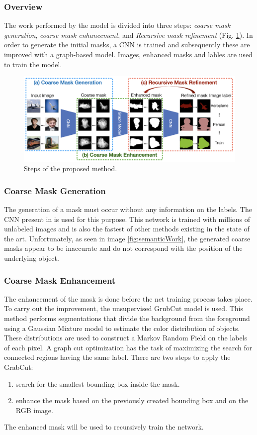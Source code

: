 \subsubsection{Overview}
The work performed by the model is divided into three steps: \emph{coarse mask 
generation}, \emph{coarse mask enhancement}, and \emph{Recursive mask refinement} (Fig. \ref{fig:step}). In 
order to generate the initial masks, a CNN is trained and subsequently these 
are improved with a graph-based model. Images, enhanced masks and lables 
are used to train the model.
\begin{figure}[h!]
    \centering
    \includegraphics[width = 1 \linewidth]{images/paper6/step.png}
    \centering
    \caption{Steps of the proposed method.}
    \label{fig:step}
\end{figure}

\subsubsection{Coarse Mask Generation}
The generation of a mask must occur without any information on the labels.
The CNN present in \cite{0876055520} is used for this purpose. This network is trained 
with millions of unlabeled images and is also the fastest of other methods 
existing in the state of the art. Unfortunately, as seen in image \ref{fig:semanticWork}, the 
generated coarse masks appear to be inaccurate and do not correspond with 
the position of the underlying object.

\subsubsection{Coarse Mask Enhancement}
The enhancement of the mask is done before the net training process takes 
place. To carry out the improvement, the unsupervised GrubCut model \cite{0876055542} 
is used. This method performs segmentations that divide the background 
from the foreground using a Gaussian Mixture model to estimate the color 
distribution of objects. These distributions are used to construct a Markov 
Random Field on the labels of each pixel. A graph cut optimization has the 
task of maximizing the search for connected regions having the same label. 
There are two steps to apply the GrabCut:
\begin{enumerate}
    \item search for the smallest bounding box inside the mask.
    \item enhance the mask based on the previously created bounding box and on the RGB image.
\end{enumerate}
The enhanced mask will be used to recursively train the network.